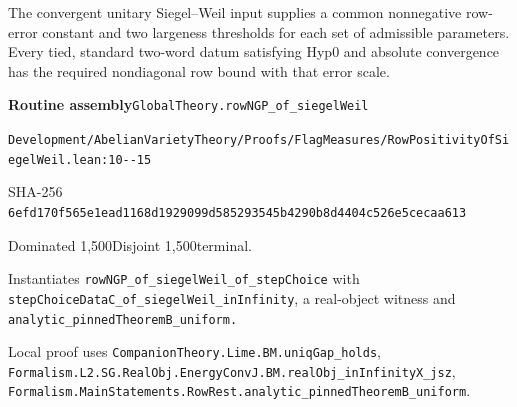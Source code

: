 \begin{formalstatement}[D033]\label{decomp:D033}
The convergent unitary Siegel–Weil input supplies a common nonnegative row-error constant and two largeness thresholds for each set of admissible parameters. Every tied, standard two-word datum satisfying Hyp0 and absolute convergence has the required nondiagonal row bound with that error scale.
\end{formalstatement}
{\small\raggedright\noindent\textsf{\bfseries Routine assembly}\quad \nolinkurl{GlobalTheory.rowNGP_of_siegelWeil}\par\noindent \nolinkurl{Development/AbelianVarietyTheory/Proofs/FlagMeasures/RowPositivityOfSiegelWeil.lean:10--15}\par\noindent SHA-256 \nolinkurl{6efd170f565e1ead1168d1929099d585293545b4290b8d4404c526e5cecaa613}\par\noindent Dominated 1,500\quad Disjoint 1,500\quad terminal.\par}
Instantiates \nolinkurl{rowNGP_of_siegelWeil_of_stepChoice} with \nolinkurl{stepChoiceDataC_of_siegelWeil_inInfinity}, a real-object witness and \nolinkurl{analytic_pinnedTheoremB_uniform.}
{\small\raggedright Local proof uses \nolinkurl{CompanionTheory.Lime.BM.uniqGap_holds}, \nolinkurl{Formalism.L2.SG.RealObj.EnergyConvJ.BM.realObj_inInfinityX_jsz}, \nolinkurl{Formalism.MainStatements.RowRest.analytic_pinnedTheoremB_uniform}.\par}
